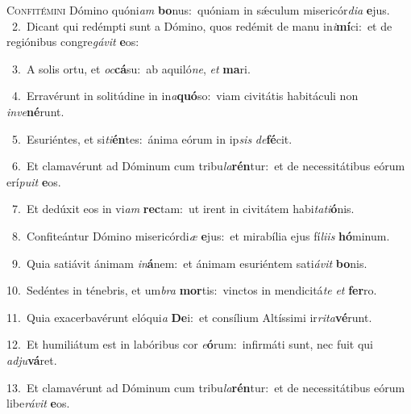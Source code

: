 \lettrine{\initial\textcolor{\initialcolor}{C}}{onfitémini} Dómino quóni\textit{am} \textbf{bo}\-nus:~\star quóniam in sǽculum misericór\-\textit{di}\-\textit{a} \textbf{e}\-jus.\\
{\numbfont\textcolor{\numbcolor}{~2.}}~Dicant qui redémpti sunt a Dómino, quos redémit de manu in\-\textit{i}\-\textbf{mí}ci:~\star et de regiónibus congre\-\textit{gá}\-\textit{vit} \textbf{e}\-os:\par
{\numbfont\textcolor{\numbcolor}{~3.}}~A solis ortu, et \textit{oc}\-\textbf{cá}su:~\star ab aquiló\-\textit{ne}\-, \textit{et} \textbf{ma}\-ri.\par
{\numbfont\textcolor{\numbcolor}{~4.}}~Erravérunt in solitúdine in in\-\textit{a}\-\textbf{quó}so:~\star viam civitátis habitáculi non \textit{in}\-\textit{ve}\textbf{né}runt.\par
{\numbfont\textcolor{\numbcolor}{~5.}}~Esuriéntes, et si\-\textit{ti}\-\textbf{én}tes:~\star ánima eórum in ip\textit{sis} \textit{de}\-\textbf{fé}cit.\par
{\numbfont\textcolor{\numbcolor}{~6.}}~Et clamavérunt ad Dóminum cum tribu\-\textit{la}\-\textbf{rén}tur:~\star et de necessitátibus eórum erí\-\textit{pu}\-\textit{it} \textbf{e}\-os.\par
{\numbfont\textcolor{\numbcolor}{~7.}}~Et dedúxit eos in vi\textit{am} \textbf{rec}\-tam:~\star ut irent in civitátem habi\-\textit{ta}\-\textit{ti}\textbf{ó}nis.\par
{\numbfont\textcolor{\numbcolor}{~8.}}~Confiteántur Dómino misericórdi\textit{æ} \textbf{e}\-jus:~\star et mirabília ejus fí\-\textit{li}\-\textit{is} \textbf{hó}\-minum.\par
{\numbfont\textcolor{\numbcolor}{~9.}}~Quia satiávit ánimam \textit{in}\-\textbf{á}nem:~\star et ánimam esuriéntem sati\-\textit{á}\-\textit{vit} \textbf{bo}\-nis.\par
{\numbfont\textcolor{\numbcolor}{10.}}~Sedéntes in ténebris, et um\textit{bra} \textbf{mor}\-tis:~\star vinctos in mendicitá\textit{te} \textit{et} \textbf{fer}\-ro.\par
{\numbfont\textcolor{\numbcolor}{11.}}~Quia exacerbavérunt elóqui\textit{a} \textbf{De}\-i:~\star et consílium Altíssimi ir\-\textit{ri}\-\textit{ta}\textbf{vé}runt.\par
{\numbfont\textcolor{\numbcolor}{12.}}~Et humiliátum est in labóribus cor \textit{e}\-\textbf{ó}rum:~\star infirmáti sunt, nec fuit qui \textit{ad}\-\textit{ju}\textbf{vá}ret.\par
{\numbfont\textcolor{\numbcolor}{13.}}~Et clamavérunt ad Dóminum cum tribu\-\textit{la}\-\textbf{rén}tur:~\star et de necessitátibus eórum libe\-\textit{rá}\-\textit{vit} \textbf{e}\-os.\par
